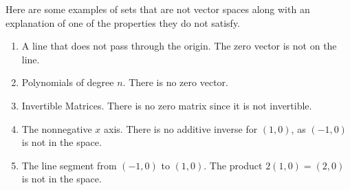 \begin{example} 
Here are some examples of sets that are not vector spaces along with an explanation of one of the properties they do not satisfy.
\begin{enumerate}
	\item A line that does not pass through the origin. The zero vector is not on the line.
	\item Polynomials of degree $n$.  There is no zero vector.
	\item Invertible Matrices. There is no zero matrix since it is not invertible.
	\item The nonnegative $x$ axis. There is no additive inverse for $(1,0)$, as $(-1,0)$ is not in the space.
	\item The line segment from $(-1,0)$ to $(1,0)$. The product $2(1,0)=(2,0)$ is not in the space.
\end{enumerate}	
\end{example}


